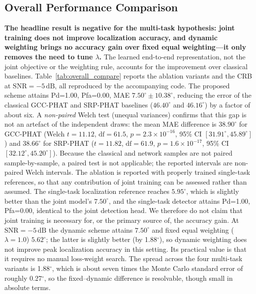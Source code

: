 \documentclass[sensors,article,submit,pdftex,moreauthors]{Definitions/mdpi}
\begin{document}
\subsection{Overall Performance Comparison}
\textbf{The headline result is negative for the multi-task hypothesis: joint training does not improve localization accuracy, and dynamic weighting brings no accuracy gain over fixed equal weighting---it only removes the need to tune $\lambda$.} The learned end-to-end representation, not the joint objective or the weighting rule, accounts for the improvement over classical baselines. Table~\ref{tab:overall_compare} reports the ablation variants and the CRB at $\mathrm{SNR}=-5\,\mathrm{dB}$, all reproduced by the accompanying code. The proposed scheme attains Pd=1.00, Pfa=0.00, MAE $7.50^\circ\pm10.38^\circ$, reducing the error of the classical GCC-PHAT and SRP-PHAT baselines ($46.40^\circ$ and $46.16^\circ$) by a factor of about six. A \emph{non-paired} Welch test (unequal variances) confirms that this gap is not an artefact of the independent draws: the mean MAE difference is $38.90^\circ$ for GCC-PHAT (Welch $t=11.12$, $\mathrm{df}=61.5$, $p=2.3\times10^{-16}$, 95\% CI $[31.91^\circ,45.89^\circ]$) and $38.66^\circ$ for SRP-PHAT ($t=11.82$, $\mathrm{df}=61.9$, $p=1.6\times10^{-17}$, 95\% CI $[32.12^\circ,45.20^\circ]$). Because the classical and network samples are not paired sample-by-sample, a paired test is not applicable; the reported intervals are non-paired Welch intervals. The ablation is reported with properly trained single-task references, so that any contribution of joint training can be assessed rather than assumed. The single-task localization reference reaches $5.95^\circ$, which is slightly better than the joint model's $7.50^\circ$, and the single-task detector attains Pd=1.00, Pfa=0.00, identical to the joint detection head. We therefore do not claim that joint training is necessary for, or the primary source of, the accuracy gain. At $\mathrm{SNR}=-5\,\mathrm{dB}$ the dynamic scheme attains $7.50^\circ$ and fixed equal weighting ($\lambda=1.0$) $5.62^\circ$; the latter is slightly better (by 1.88$^\circ$), so dynamic weighting does not improve peak localization accuracy in this setting. Its practical value is that it requires no manual loss-weight search. The spread across the four multi-task variants is 1.88$^\circ$, which is about seven times the Monte Carlo standard error of roughly 0.27$^\circ$, so the fixed--dynamic difference is resolvable, though small in absolute terms.
\end{document}
